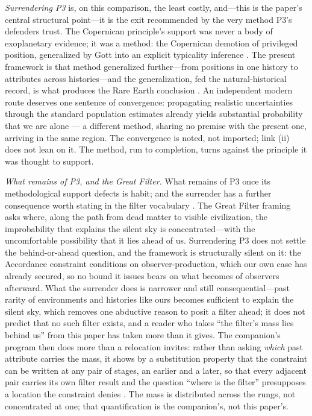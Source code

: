 \emph{Surrendering P3} is, on this comparison, the least costly, and---this is the paper's central structural point---it is the exit recommended by the very method P3's defenders trust. The Copernican principle's support was never a body of exoplanetary evidence; it was a method: the Copernican demotion of privileged position, generalized by Gott into an explicit typicality inference \cite{gott1993implications}. The present framework is that method generalized further---from positions in one history to attributes across histories---and the generalization, fed the natural-historical record, is what produces the Rare Earth conclusion \cite{Nexus, ward2000rare}. An independent modern route deserves one sentence of convergence: propagating realistic uncertainties through the standard population estimates already yields substantial probability that we are alone \cite{sandberg2018dissolving} --- a different method, sharing no premise with the present one, arriving in the same region. The convergence is noted, not imported; link (ii) does not lean on it. The method, run to completion, turns against the principle it was thought to support.

\textit{What remains of P3, and the Great Filter.} What remains of P3 once its methodological support defects is habit; and the surrender has a further consequence worth stating in the filter vocabulary \cite{hanson1998greatfilter}. The Great Filter framing asks where, along the path from dead matter to visible civilization, the improbability that explains the silent sky is concentrated---with the uncomfortable possibility that it lies ahead of us. Surrendering P3 does not settle the behind-or-ahead question, and the framework is structurally silent on it: the Accordance constraint conditions on observer-production, which our own case has already secured, so no bound it issues bears on what becomes of observers afterward. What the surrender does is narrower and still consequential---past rarity of environments and histories like ours becomes sufficient to explain the silent sky, which removes one abductive reason to posit a filter ahead; it does not predict that no such filter exists, and a reader who takes ``the filter's mass lies behind us'' from this paper has taken more than it gives. The companion's program then does more than a relocation invites: rather than asking \emph{which} past attribute carries the mass, it shows by a substitution property that the constraint can be written at any pair of stages, an earlier and a later, so that every adjacent pair carries its own filter result and the question ``where is the filter'' presupposes a location the constraint denies \cite{Nexus}. The mass is distributed across the rungs, not concentrated at one; that quantification is the companion's, not this paper's.

